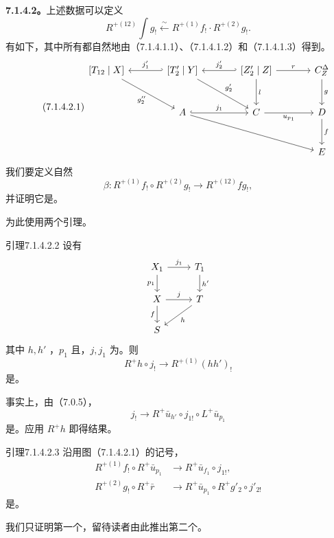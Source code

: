 \textbf{7.1.4.2。}上述数据可以定义
\[R^{+(12)}\int g_!\xleftarrow\sim R^{+(1)}f_!\cdot R^{+(2)}g_!.\]
有如下，其中所有都自然地由（7.1.4.1.1）、（7.1.4.1.2）和（7.1.4.1.3）得到。
\begin{equation}\tag{7.1.4.2.1}
\begin{tikzcd}[column sep=large,row sep=large]
{[T_{12}\mid X]}\arrow[dr,"g''_2"']&{[T'_2\mid Y]}\arrow[l,hook',"j'_1"']\arrow[dr,"g'_2"]&{[Z'_2\mid Z]}\arrow[l,hook',"j'_2"']\arrow[d,"l"]\arrow[r,"r"]&C_Z^\Delta\arrow[d,"g"]\\
&A\arrow[r,hook,"j_1"]\arrow[drr]&C\arrow[r,"u_{p_1}"']&D\arrow[d,"f"]\\
&&&E
\end{tikzcd}
\end{equation}
我们要定义自然
\[\beta:R^{+(1)}f_!\circ R^{+(2)}g_!\longrightarrow R^{+(12)}fg_!,\]
并证明它是。

为此使用两个引理。
\begin{SGAresult}{引理}{7.1.4.2.2}
设有
\[
\begin{tikzcd}
X_1\arrow[r,"j_1"]\arrow[d,"p_1"']&T_1\arrow[d,"h'"]\\
X\arrow[r,"j"]\arrow[d,"f"']&T\arrow[dl,"h"]\\
S&
\end{tikzcd}
\]
其中 $h,h'$ ，$p_1$ 且，$j,j_1$ 为。则
\[R^+h\circ j_!\longrightarrow R^{+(1)}(hh')_!\]
是。
\end{SGAresult}
事实上，由（7.0.5），
\[j_!\longrightarrow R^+\bar u_{h'}\circ j_{1!}\circ L^+\bar u_{p_1}\]
是。应用 $R^+h$ 即得结果。

\begin{SGAresult}{引理}{7.1.4.2.3}
沿用图（7.1.4.2.1）的记号，
\[
\begin{aligned}
R^{+(1)}f_!\circ R^+\bar u_{p_1}&\longrightarrow R^+\bar u_{f_1}\circ j_{1!},\\
R^{+(2)}g_!\circ R^+\bar r&\longrightarrow R^+\bar u_{p_1}\circ R^+g'_2\circ j'_{2!}
\end{aligned}
\]
是。
\end{SGAresult}
我们只证明第一个，留待读者由此推出第二个。

